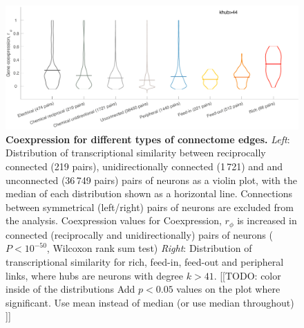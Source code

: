 \documentclass[10pt,letterpaper]{article}
\begin{document}
\begin{figure}[h]
\centering
    \includegraphics[width=1\textwidth]{distributionsALL.pdf}
    \caption{
\textbf{Coexpression for different types of connectome edges.}
\emph{Left}: Distribution of transcriptional similarity between reciprocally connected (219 pairs), unidirectionally connected (1\,721) and  and unconnected (36\,749 pairs) pairs of neurons as a violin plot, with the median of each distribution shown as a horizontal line.
Connections between symmetrical (left/right) pairs of neurons are excluded from the analysis. Coexpression values for
Coexpression, $r_\phi$ is increased in connected (reciprocally and unidirectionally) pairs of neurons ($P < 10^{-50}$, Wilcoxon rank sum test)
\emph{Right}: Distribution of transcriptional similarity for rich, feed-in, feed-out and peripheral links, where hubs are neurons with degree $k>41$.
[[TODO: color inside of the distributions
Add $p<0.05$ values on the plot where significant.
Use mean instead of median (or use median throughout)
]]
\label{fig:S_RFPdistributions}
}
\end{figure}
\end{document}
